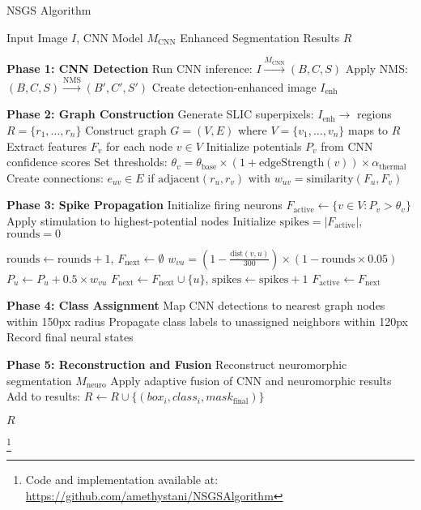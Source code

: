 \documentclass[conference]{IEEEtran}
\begin{document}
\begin{algorithm}[!t]
\caption{NSGS Algorithm}
\label{alg:nsgs}
\begin{algorithmic}[1]
\REQUIRE Input Image $I$, CNN Model $M_{\text{CNN}}$
\ENSURE Enhanced Segmentation Results $R$

\STATE \textbf{Phase 1: CNN Detection}
\STATE Run CNN inference: $I \xrightarrow{M_{\text{CNN}}} (B, C, S)$ 
\STATE Apply NMS: $(B, C, S) \xrightarrow{\text{NMS}} (B', C', S')$
\STATE Create detection-enhanced image $I_{\text{enh}}$

\STATE \textbf{Phase 2: Graph Construction}
\STATE Generate SLIC superpixels: $I_{\text{enh}} \rightarrow$ regions $R = \{r_1,\ldots,r_n\}$
\STATE Construct graph $G = (V, E)$ where $V = \{v_1,\ldots,v_n\}$ maps to $R$
\STATE Extract features $F_v$ for each node $v \in V$ 
\STATE Initialize potentials $P_v$ from CNN confidence scores
\STATE Set thresholds: $\theta_v = \theta_{\text{base}} \times (1 + \text{edgeStrength}(v)) \times \alpha_{\text{thermal}}$
\STATE Create connections: $e_{uv} \in E$ if $\text{adjacent}(r_u, r_v)$ with $w_{uv} = \text{similarity}(F_u, F_v)$

\STATE \textbf{Phase 3: Spike Propagation}
\STATE Initialize firing neurons $F_{\text{active}} \leftarrow \{v \in V : P_v > \theta_v\}$
    \STATE Apply stimulation to highest-potential nodes
\ENDIF
\STATE Initialize $\text{spikes} = |F_{\text{active}}|$, $\text{rounds} = 0$

    \STATE $\text{rounds} \leftarrow \text{rounds} + 1$, $F_{\text{next}} \leftarrow \emptyset$
            \STATE $w_{vu} = \left(1 - \frac{\text{dist}(v,u)}{300}\right) \times (1 - \text{rounds} \times 0.05)$
            \STATE $P_u \leftarrow P_u + 0.5 \times w_{vu}$ 
                \STATE $F_{\text{next}} \leftarrow F_{\text{next}} \cup \{u\}$, $\text{spikes} \leftarrow \text{spikes} + 1$
            \ENDIF
        \ENDFOR
    \ENDFOR
    \STATE $F_{\text{active}} \leftarrow F_{\text{next}}$
\ENDWHILE

\STATE \textbf{Phase 4: Class Assignment}
\STATE Map CNN detections to nearest graph nodes within 150px radius
\STATE Propagate class labels to unassigned neighbors within 120px
\STATE Record final neural states

\STATE \textbf{Phase 5: Reconstruction and Fusion}
\STATE Reconstruct neuromorphic segmentation $M_{\text{neuro}}$
    \STATE Apply adaptive fusion of CNN and neuromorphic results
    \STATE Add to results: $R \leftarrow R \cup \{(box_i, class_i, mask_{\text{final}})\}$
\ENDFOR

\RETURN $R$
\end{algorithmic}
\end{algorithm}
\footnote{Code and implementation available at: \url{https://github.com/amethystani/NSGSAlgorithm}}
\end{document}
